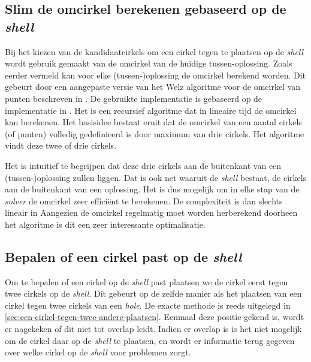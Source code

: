 \documentclass[12pt,a4paper,oneside]{book}
\begin{document}
{\subsection{Slim de omcirkel berekenen gebaseerd op de \textit{shell}}

Bij het kiezen van de kandidaatcirkels om een cirkel tegen te plaatsen op de \textit{shell} wordt gebruik gemaakt van de omcirkel van de huidige tussen-oplossing.
Zoals eerder vermeld kan voor elke (tussen-)oplossing de omcirkel berekend worden.
Dit gebeurt door een aangepaste versie van het Welz algoritme voor de omcirkel van punten beschreven in \cite{welzl1991smallest}.
De gebruikte implementatie is gebaseerd op de implementatie in \cite{sunshine2008welzl}.
Het is een recursief algoritme dat in lineaire tijd de omcirkel kan berekenen.
Het basisidee bestaat eruit dat de omcirkel van een aantal cirkels (of punten) volledig gedefinieerd is door maximum van drie cirkels.
Het algoritme vindt deze twee of drie cirkels.

Het is intuitief te begrijpen dat deze drie cirkels aan de buitenkant van een (tussen-)oplossing zullen liggen.
Dat is ook net waaruit de \textit{shell} bestaat, de cirkels aan de buitenkant van een oplossing.
Het is dus mogelijk om in elke stap van de \textit{solver} de omcirkel zeer efficiënt te berekenen.
De complexiteit is dan slechts lineair in %
Aangezien de omcirkel regelmatig moet worden herberekend  doorheen het algoritme is dit een zeer interessante optimalisatie.

\subsection{Bepalen of een cirkel past op de \textit{shell}} \label{sec:bepalen-of-een-cirkel-past-op-de-shell}

Om te bepalen of een cirkel op de \textit{shell} past plaatsen we de cirkel eerst tegen twee cirkels op de \textit{shell}.
Dit gebeurt op de zelfde manier als het plaatsen van een cirkel tegen twee cirkels van een \textit{hole}.
De exacte methode is reeds uitgelegd in \autoref{sec:een-cirkel-tegen-twee-andere-plaatsen}.
Eenmaal deze positie gekend is, wordt er nagekeken of dit niet tot overlap leidt.
Indien er overlap is is het niet mogelijk om de cirkel daar op de \textit{shell} te plaatsen, en wordt er informatie terug gegeven over welke cirkel op de \textit{shell} voor problemen zorgt.

}
\end{document}
